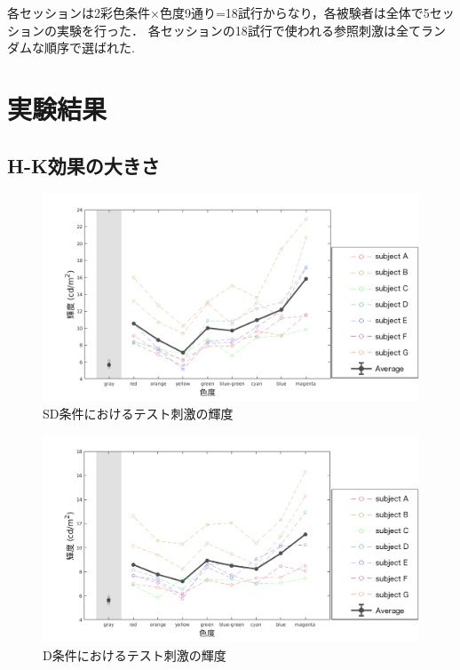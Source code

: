             各セッションは2彩色条件$\times$色度9通り=18試行からなり，各被験者は全体で5セッションの実験を行った．
            各セッションの18試行で使われる参照刺激は全てランダムな順序で選ばれた.

    \section{実験結果}

        \subsection{H-K効果の大きさ}

            \begin{figure}[h]
                \centering
                \includegraphics[width=14.0cm]{./img/ex2_res_SD_p.png}
                \caption{SD条件におけるテスト刺激の輝度}
                \label{ex2_SD}
            \end{figure}

            \begin{figure}[h]
                \centering
                \includegraphics[width=14.0cm]{./img/ex2_res_D_p.png}
                \caption{D条件におけるテスト刺激の輝度}
                \label{ex2_D}
            \end{figure}

